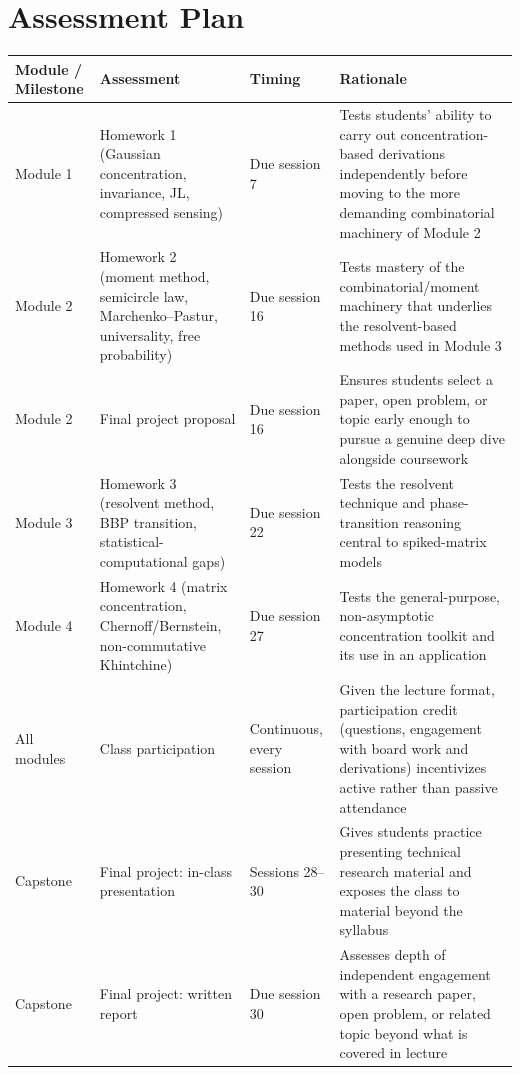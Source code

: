 \documentclass[11pt]{article}
\begin{document}
\section{Assessment Plan}

\begin{longtable}{p{3.5cm}p{3.5cm}p{2.3cm}p{5.0cm}}
\toprule
\textbf{Module / Milestone} & \textbf{Assessment} & \textbf{Timing} & \textbf{Rationale} \\
\midrule
\endhead
Module 1 & Homework 1 (Gaussian concentration, invariance, JL, compressed sensing) & Due session 7 & Tests students' ability to carry out concentration-based derivations independently before moving to the more demanding combinatorial machinery of Module 2 \\
Module 2 & Homework 2 (moment method, semicircle law, Marchenko--Pastur, universality, free probability) & Due session 16 & Tests mastery of the combinatorial/moment machinery that underlies the resolvent-based methods used in Module 3 \\
Module 2 & Final project proposal & Due session 16 & Ensures students select a paper, open problem, or topic early enough to pursue a genuine deep dive alongside coursework \\
Module 3 & Homework 3 (resolvent method, BBP transition, statistical-computational gaps) & Due session 22 & Tests the resolvent technique and phase-transition reasoning central to spiked-matrix models \\
Module 4 & Homework 4 (matrix concentration, Chernoff/Bernstein, non-commutative Khintchine) & Due session 27 & Tests the general-purpose, non-asymptotic concentration toolkit and its use in an application \\
All modules & Class participation & Continuous, every session & Given the lecture format, participation credit (questions, engagement with board work and derivations) incentivizes active rather than passive attendance \\
Capstone & Final project: in-class presentation & Sessions 28--30 & Gives students practice presenting technical research material and exposes the class to material beyond the syllabus \\
Capstone & Final project: written report & Due session 30 & Assesses depth of independent engagement with a research paper, open problem, or related topic beyond what is covered in lecture \\
\bottomrule
\end{longtable}
\end{document}
